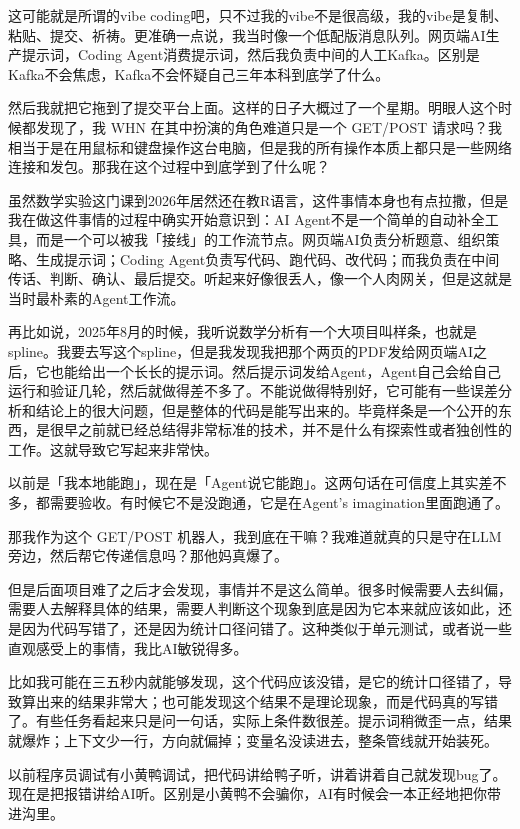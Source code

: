 这可能就是所谓的vibe coding吧，只不过我的vibe不是很高级，我的vibe是复制、粘贴、提交、祈祷。更准确一点说，我当时像一个低配版消息队列。网页端AI生产提示词，Coding Agent消费提示词，然后我负责中间的人工Kafka。区别是Kafka不会焦虑，Kafka不会怀疑自己三年本科到底学了什么。

然后我就把它拖到了提交平台上面。这样的日子大概过了一个星期。明眼人这个时候都发现了，我 WHN 在其中扮演的角色难道只是一个 GET/POST 请求吗？我相当于是在用鼠标和键盘操作这台电脑，但是我的所有操作本质上都只是一些网络连接和发包。那我在这个过程中到底学到了什么呢？

虽然数学实验这门课到2026年居然还在教R语言，这件事情本身也有点拉撒，但是我在做这件事情的过程中确实开始意识到：AI Agent不是一个简单的自动补全工具，而是一个可以被我「接线」的工作流节点。网页端AI负责分析题意、组织策略、生成提示词；Coding Agent负责写代码、跑代码、改代码；而我负责在中间传话、判断、确认、最后提交。听起来好像很丢人，像一个人肉网关，但是这就是当时最朴素的Agent工作流。

再比如说，2025年8月的时候，我听说数学分析有一个大项目叫样条，也就是spline。我要去写这个spline，但是我发现我把那个两页的PDF发给网页端AI之后，它也能给出一个长长的提示词。然后提示词发给Agent，Agent自己会给自己运行和验证几轮，然后就做得差不多了。不能说做得特别好，它可能有一些误差分析和结论上的很大问题，但是整体的代码是能写出来的。毕竟样条是一个公开的东西，是很早之前就已经总结得非常标准的技术，并不是什么有探索性或者独创性的工作。这就导致它写起来非常快。

以前是「我本地能跑」，现在是「Agent说它能跑」。这两句话在可信度上其实差不多，都需要验收。有时候它不是没跑通，它是在Agent's imagination里面跑通了。

那我作为这个 GET/POST 机器人，我到底在干嘛？我难道就真的只是守在LLM旁边，然后帮它传递信息吗？那他妈真爆了。

但是后面项目难了之后才会发现，事情并不是这么简单。很多时候需要人去纠偏，需要人去解释具体的结果，需要人判断这个现象到底是因为它本来就应该如此，还是因为代码写错了，还是因为统计口径问错了。这种类似于单元测试，或者说一些直观感受上的事情，我比AI敏锐得多。

比如我可能在三五秒内就能够发现，这个代码应该没错，是它的统计口径错了，导致算出来的结果非常大；也可能发现这个结果不是理论现象，而是代码真的写错了。有些任务看起来只是问一句话，实际上条件数很差。提示词稍微歪一点，结果就爆炸；上下文少一行，方向就偏掉；变量名没读进去，整条管线就开始装死。

以前程序员调试有小黄鸭调试，把代码讲给鸭子听，讲着讲着自己就发现bug了。现在是把报错讲给AI听。区别是小黄鸭不会骗你，AI有时候会一本正经地把你带进沟里。

